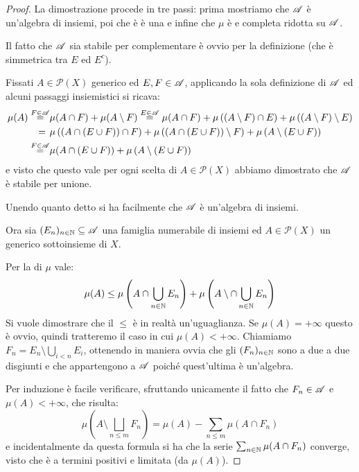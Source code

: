 \begin{proof}
	La dimostrazione procede in tre passi: prima mostriamo che $\mathscr A$ è un'algebra di insiemi, poi che è è una \sigalg{} e infine che $\mu$ è \sigadd{} e completa ridotta su $\mathscr A$.
	
	Il fatto che $\mathscr A$ sia stabile per complementare è ovvio per la definizione (che è simmetrica tra $E$ ed $E^c$).
	
	Fissati $A\in\mathcal P(X)$ generico ed $E,F\in\mathscr A$, applicando la sola definizione di $\mathscr A$ ed alcuni passaggi insiemistici si ricava:
	\begin{align*}
		\mu(A)\stackrel{F\in\mathscr A}{=}&\mu(A\cap F)+\mu(A\setminus F)\stackrel{E\in\mathscr A}{=}
		\mu(A\cap F)+\mu\left((A\setminus F)\cap E\right)+\mu\left((A\setminus F)\setminus E\right)\\
		=\hspace{0.4em}&\mu\left((A\cap (E\cup F))\cap F\right)+\mu\left((A\cap (E\cup F))\setminus F\right)+
		\mu\left(A\setminus(E\cup F)\right)\\
		\stackrel{F\in\mathscr A}{=}&\mu(A\cap (E\cup F))+\mu\left(A\setminus(E\cup F)\right)
	\end{align*}
	e visto che questo vale per ogni scelta di $A\in\mathcal P(X)$ abbiamo dimostrato che $\mathscr A$ è stabile per unione.
	
	Unendo quanto detto si ha facilmente che $\mathscr A$ è un'algebra di insiemi.
	
	Ora sia $(E_n)_{n\in\mathbb N}\subseteq \mathscr A$ una famiglia numerabile di insiemi ed $A\in\mathcal P(X)$ un generico sottoinsieme di $X$.
	
	Per la \sigsubadd[ità] di $\mu$ vale:
	\begin{equation}\label{DisuguaglianzaFacileCaratheodory}
		\mu(A)\le \mu\left(A\cap\bigcup_{n\in\mathbb N} E_n\right)+\mu\left(A\setminus\cap\bigcup_{n\in\mathbb N} E_n\right)
	\end{equation}
	Si vuole dimostrare che il $\le$ è in realtà un'uguaglianza. Se $\mu(A)=+\infty$ questo è ovvio, quindi tratteremo il caso in cui $\mu(A)<+\infty$. Chiamiamo $F_n=E_n\setminus \bigcup_{i<n} E_i$, ottenendo in maniera ovvia che gli $(F_n)_{n\in\mathbb N}$ sono a due a due disgiunti e che appartengono a $\mathscr A$ poiché quest'ultima è un'algebra.
	
	Per induzione è facile verificare, sfruttando unicamente il fatto che $F_n\in\mathscr A$ e $\mu(A)<+\infty$, che risulta:
	\begin{equation}\label{IdentitaDifferenzaCaratheodory}
		\mu\left(A\setminus \bigsqcup_{n\le m} F_n\right)=\mu(A)-\sum_{n\le m} \mu(A\cap F_n)
	\end{equation}
	e incidentalmente da questa formula si ha che la serie $\sum_{n\in\mathbb N}\mu(A\cap F_n)$ converge, visto che è a termini positivi e limitata (da $\mu(A)$).
	

\end{proof}
